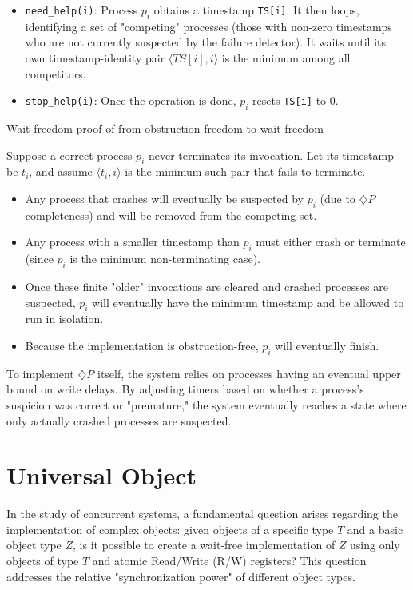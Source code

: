 \begin{itemize}
    \item \texttt{need\_help(i)}: Process $p_i$ obtains a timestamp \texttt{TS[i]}. It then loops, identifying a set of "competing" processes (those with non-zero timestamps who are not currently suspected by the failure detector). It waits until its own timestamp-identity pair $\langle TS[i],i\rangle$ is the minimum among all competitors.
    \item \texttt{stop\_help(i)}: Once the operation is done, $p_i$ resets \texttt{TS[i]} to 0.
\end{itemize}

\begin{Thm}{Wait-freedom proof of from obstruction-freedom to wait-freedom}{}
\begin{demonstration}
    Suppose a correct process $p_i$ never terminates its invocation. Let its timestamp be $t_i$, and assume $\langle t_i,i\rangle$ is the minimum such pair that fails to terminate.
    \begin{itemize}
        \item Any process that crashes will eventually be suspected by $p_i$ (due to $\diamondsuit P$ completeness) and will be removed from the competing set.
        \item Any process with a smaller timestamp than $p_i$ must either crash or terminate (since $p_i$ is the minimum non-terminating case).
        \item Once these finite "older" invocations are cleared and crashed processes are suspected, $p_i$ will eventually have the minimum timestamp and be allowed to run in isolation.
        \item Because the implementation is obstruction-free, $p_i$ will eventually finish.
    \end{itemize}
    
    To implement $\diamondsuit P$ itself, the system relies on processes having an eventual upper bound on write delays. By adjusting timers based on whether a process's suspicion was correct or "premature," the system eventually reaches a state where only actually crashed processes are suspected.
\end{demonstration}
\end{Thm}

\chapter{Universal Object}
In the study of concurrent systems, a fundamental question arises regarding the implementation of complex objects: given objects of a specific type $T$ and a basic object type $Z$, is it possible to create a wait-free implementation of $Z$ using only objects of type $T$ and atomic Read/Write (R/W) registers? This question addresses the relative "synchronization power" of different object types.

